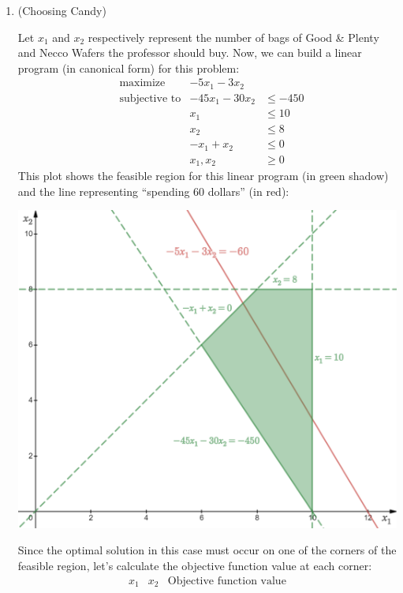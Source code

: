 \documentclass{article}
\begin{document}
\begin{enumerate}

  \item (Choosing Candy)

    Let $x_1$ and $x_2$ respectively represent the number of bags of Good \& Plenty and Necco Wafers the professor should buy. Now, we can build a linear program (in canonical form) for this problem:
    $$
      \begin{aligned}
         & \text{maximize}      & -5x_1 - 3x_2              \\
         & \text{subjective to} & -45x_1 - 30x_2 & \le -450 \\
         &                      & x_1            & \le 10   \\
         &                      & x_2            & \le 8    \\
         &                      & -x_1 + x_2     & \le 0    \\
         &                      & x_1, x_2       & \ge 0
      \end{aligned}
    $$
    This plot shows the feasible region for this linear program (in green shadow) and the line representing ``spending 60 dollars'' (in red):
    \begin{center}
      \href{https://www.desmos.com/calculator/amudvktrfc}{\includegraphics[width=0.75\linewidth]{images/q1b_1.png}}
    \end{center}
    Since the optimal solution in this case must occur on one of the corners of the feasible region, let's calculate the objective function value at each corner:
    $$
      \begin{array}{|cc|c|}
        \hline
        x_1 & x_2 & \text{Objective function value} \\

\end{array}$$
\end{enumerate}
\end{document}
